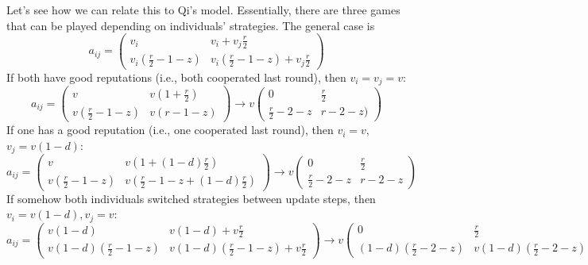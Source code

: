 \documentclass[13pt]{amsart}
\begin{document}
Let's see how we can relate this to Qi's model.
Essentially, there are three games that can be played depending on individuals' strategies.
The general case is
\begin{equation}
    a_{ij} =
    \begin{pmatrix}
        v_i & v_i + v_j\frac{r}{2} \\
        v_i(\frac{r}{2} - 1 - z) & v_i(\frac{r}{2} - 1 - z) + v_j\frac{r}{2}
    \end{pmatrix}
\end{equation}
If both have good reputations (i.e., both cooperated last round), then $v_i = v_j = v$:
\begin{equation}
    a_{ij} =
    \begin{pmatrix}
        v & v(1 + \frac{r}{2}) \\
        v(\frac{r}{2} - 1 - z) & v(r - 1 - z)
    \end{pmatrix}
    \to
    v\begin{pmatrix}
        0 & \frac{r}{2} \\
        \frac{r}{2} - 2 - z & r - 2 - z)
    \end{pmatrix}
\end{equation}
If one has a good reputation (i.e., one cooperated last round), then $v_i = v$, $v_j = v(1-d)$:
\begin{equation}
    a_{ij} =
    \begin{pmatrix}
        v & v(1 + (1-d)\frac{r}{2}) \\
        v(\frac{r}{2} - 1 - z) & v(\frac{r}{2} - 1 - z + (1-d)\frac{r}{2})
    \end{pmatrix}
    \to
    v
    \begin{pmatrix}
        0 & \frac{r}{2} \\
        \frac{r}{2} - 2 - z & r - 2 - z
    \end{pmatrix}
\end{equation}
If somehow both individuals switched strategies between update steps, then $v_i = v(1-d), v_j = v$:
\begin{equation}
    a_{ij} =
    \begin{pmatrix}
        v(1-d) & v(1-d) + v\frac{r}{2} \\
        v(1-d)(\frac{r}{2} - 1 - z) & v(1-d)(\frac{r}{2} - 1 - z) + v\frac{r}{2}
    \end{pmatrix}
    \to
    v\begin{pmatrix}
        0 & \frac{r}{2} \\
        (1-d)(\frac{r}{2} - 2 - z) & v(1-d)(\frac{r}{2} - 2 - z) + v\frac{r}{2}
    \end{pmatrix}
\end{equation}
\end{document}
